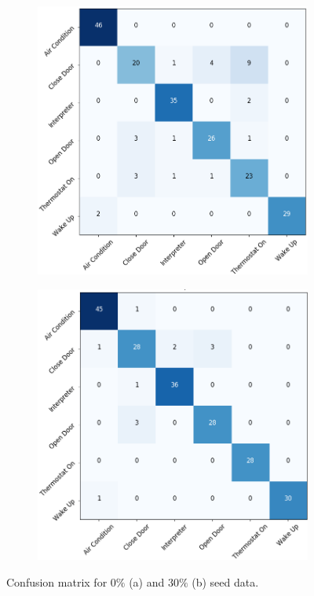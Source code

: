 \documentclass[10pt,twocolumn,letterpaper]{article}
\begin{document}
\begin{figure}
	\begin{center}
		\begin{subfigure}{.45\textwidth}
			\includegraphics[width=\linewidth, height=.25\textheight]{cm_zero_percent_cropped}
			\caption{}
			\label{fig:cm_zero} 
		\end{subfigure}
		
		\begin{subfigure}{.45\textwidth}
			\includegraphics[width=\linewidth, height=.25\textheight]{cm_thirty_percent_cropped}
			\caption{}
			\label{fig:cm_thirty} 
		\end{subfigure}
	\end{center}
	\caption{Confusion matrix for $0\%$ (a) and $30\%$ (b) seed data.}
	\label{fig:conf_mat}
\end{figure}
\end{document}
